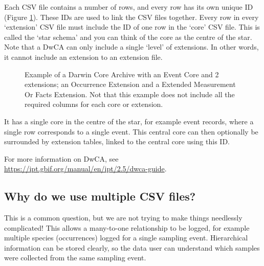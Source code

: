 \documentclass[a4paper,english, 11pt]{article}
\begin{document}
Each CSV file contains a number of rows, and every row has its own unique ID (Figure \ref{fig:csvs}). These IDs are used to link the CSV files together. Every row in every `extension' CSV file must include the ID of one row in the `core' CSV file. This is called the `star schema' and you can think of the core as the centre of the star. Note that a DwCA can only include a single `level' of extensions. In other words, it cannot include an extension to an extension file.

\begin{figure}[htb]
    \caption{\label{fig:csvs}
        Example of a Darwin Core Archive with an Event Core and 2 extensions; an Occurrence Extension and a Extended Measurement Or Facts Extension. Not that this example does not include all the required columns for each core or extension. 
    }
\end{figure}

It has a single core in the centre of the star, for example event records, where a single row corresponds to a single event. 
This central core can then optionally be surrounded by extension tables, linked to the central core using this ID. 

For more information on DwCA, see \url{https://ipt.gbif.org/manual/en/ipt/2.5/dwca-guide}.


\subsection{Why do we use multiple CSV files?}
\label{ss:multiplefiles}

This is a common question, but we are not trying to make things needlessly complicated! This allows a many-to-one relationship to be logged, for example multiple species (occurrences) logged for a single sampling event. Hierarchical information can be stored clearly, so the data user can understand which samples were collected from the same sampling event.
\end{document}
